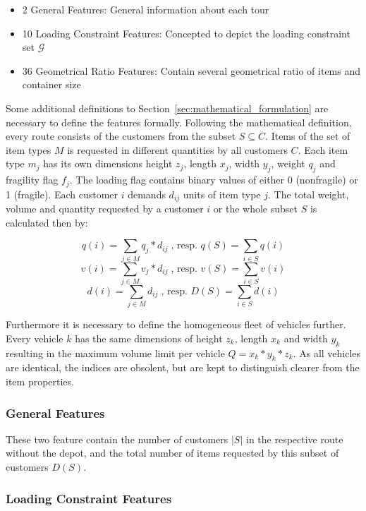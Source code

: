 \begin{itemize}
    \item 2 General Features: General information about each tour
    \item 10 Loading Constraint Features: Concepted to depict the loading constraint set $\mathcal{G}$
    \item 36 Geometrical Ratio Features: Contain several geometrical ratio of items and container size
\end{itemize}

Some additional definitions to Section~\ref{sec:mathematical_formulation}
are necessary to define the features formally. Following the mathematical definition, every route consists of the customers
from the subset $S \subseteq C$. Items of the set of item types $M$ is requested in different quantities by all customers $C$.
Each item type $m_j$ has its own dimensions height $z_j$, length $x_j$, width $y_j$, weight $q_j$ and fragility flag $f_j$.
The loading flag contains binary values of either 0 (nonfragile) or 1 (fragile).
Each customer $i$ demands $d_{ij}$ units of item type $j$.
The total weight, volume and quantity requested by a customer $i$ or the whole subset $S$ is calculated then by:

\[q(i) = \sum_{j \in M} q_j * d_{ij}\;\text{, resp. } q(S) = \sum_{i\in S} q(i)\]
\[v(i) = \sum_{j \in M} v_j * d_{ij}\;\text{, resp. } v(S) = \sum_{i\in S} v(i)\]
\[d(i) = \sum_{j \in M} d_{ij}\;\text{, resp. } D(S) = \sum_{i\in S} d(i)\]

Furthermore it is necessary to define the homogeneous fleet of vehicles
further. Every vehicle $k$ has the same dimensions of height $z_k$, length $x_k$ and width $y_k$ resulting in the maximum volume limit per
vehicle $Q = x_k *y_k*z_k$. As all vehicles are identical, the indices are obsolent, but are kept to distinguish clearer
from the item properties.

\subsubsection{General Features}
These two feature contain the number of customers $|S|$ in the respective route without the depot, and the total number of items requested by
this subset of customers $D(S)$.

\subsubsection{Loading Constraint Features}

